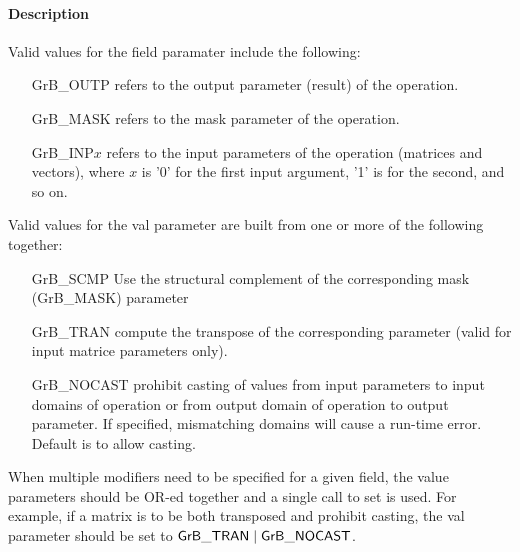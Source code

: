 \paragraph{Description}

Valid values for the {\sf field} paramater include the following:

\begin{itemize}[leftmargin=1.5in]
\item[{\sf GrB\_OUTP}]   refers to the output parameter (result) of the operation.
\item[{\sf GrB\_MASK}]   refers to the mask parameter of the operation.
\item[{\sf GrB\_INP}$x$] refers to the input parameters of the operation (matrices and vectors), 
                         where $x$ is '0' for the first input argument, '1' is for the second, and so on.
\end{itemize}

Valid values for the {\sf val} parameter are built from one or
more of the following together:

\begin{itemize}[leftmargin=1.5in]
\item[{\sf GrB\_SCMP}]   Use the structural complement of the corresponding mask
                         (GrB\_MASK) parameter
\item[{\sf GrB\_TRAN}]   compute the transpose of the corresponding parameter (valid
                         for input matrice parameters only).
\item[{\sf GrB\_NOCAST}] prohibit casting of values from input parameters to input domains 
                         of operation or from output domain of operation to output 
                         parameter. If specified, mismatching domains will cause a 
                         run-time error. Default is to allow casting.
\end{itemize}

When multiple modifiers need to be specified for a given field, the value parameters 
should be OR-ed together and a single call to set is used.  For example, if a matrix is to 
be both transposed and prohibit casting, the {\sf val} parameter should be set to
${\sf GrB\_TRAN} \mid {\sf GrB\_NOCAST}$.  



